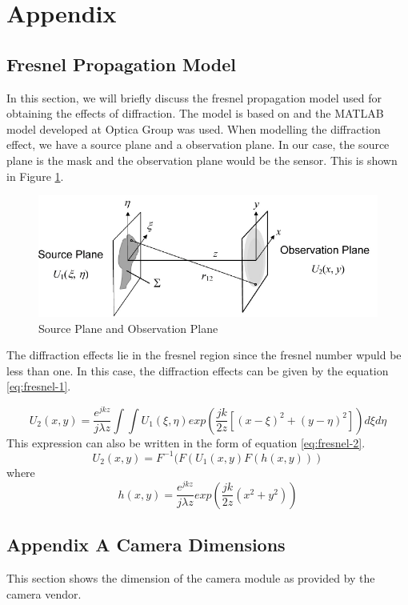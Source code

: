 \chapter*{Appendix}
\section*{Fresnel Propagation Model}
In this section, we will briefly discuss the fresnel propagation model used for obtaining the effects of diffraction. The model is based on \cite{FourierOptics} and the MATLAB model developed at Optica Group was used. When modelling the diffraction effect, we have a source plane and a observation plane. In our case, the source plane is the mask and the observation plane would be the sensor. This is shown in Figure \ref{fig:fresnel_1}. 
\begin{figure}[!htbp]
\centering
\includegraphics[width = \linewidth]{pics/fresnel-1}
\caption{Source Plane and Observation Plane}
\label{fig:fresnel_1}
\end{figure}
The diffraction effects lie in the fresnel region since the fresnel number wpuld be less than one. In this case, the diffraction effects can be given by the equation \ref{eq:fresnel-1}.

\begin{equation}
\label{eq:fresnel-1}
U_2(x,y) = \frac{e^{jkz}}{j\lambda z}\int \int U_1(\xi, \eta )exp(\frac{jk}{2z}[(x - \xi)^2 + (y - \eta)^2])d\xi d\eta
\end{equation}
This expression can also be written in the form of equation \ref{eq:fresnel-2}.
\begin{equation}
\label{eq:fresnel-2}
U_2(x,y) = F^{-1}(F(U_1(x,y)F(h(x,y)))
\end{equation}
where
\begin{equation}
\label{eq:fresnel-3}
h(x,y) = \frac{e^{jkz}}{j\lambda z}exp(\frac{jk}{2z}(x^2 + y^2))
\end{equation}

\section*{Appendix A Camera Dimensions}
This section shows the dimension of the camera module as provided by the camera vendor.

